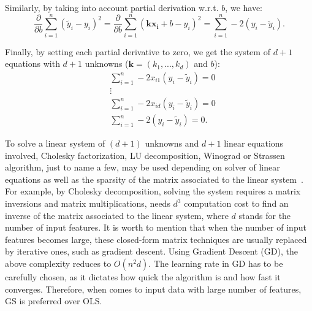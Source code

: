 \documentclass[a4paper,12pt]{elsarticle}
\begin{document}
	Similarly, by taking into account  partial derivation w.r.t. $b$, we have: 
	$$  \frac{\partial}{\partial b} \sum_{i=1}^{n} (\tilde{y}_i - y_i)^2  = \frac{\partial}{\partial b} \sum_{i=1}^{n} ( \mathbf{k}\mathbf{x_i}+b  - y_i)^2 = \sum_{i=1}^{n} -2  (y_i - \tilde{y}_i). $$
	
	Finally, by setting each partial derivative to zero, we get the system of $d+1$ equations with $d+1$ unknowns ($\mathbf{k}=(k_1, ..., k_d)$ and $b$): 
	\begin{align*}
		& \sum_{i=1}^{n} -2x_{i1} (y_i - \tilde{y}_i) = 0 \\
		& \vdots \\
		& \sum_{i=1}^{n} -2x_{id} (y_i - \tilde{y}_i) = 0 \\
		&\sum_{i=1}^{n} -2  (y_i - \tilde{y}_i) = 0.
	\end{align*}

To solve a linear system of $(d+1)$ unknowns and $d+1$ linear equations involved,  Cholesky  factorization, LU decomposition, Winograd or Strassen algorithm, just to name a few, may be used depending on solver of linear equations as well as the sparsity of the matrix associated to the linear system~\cite{krishnamoorthy2013matrix}. For example, by Cholesky decomposition, solving the system requires a matrix inversions and matrix multiplications, needs $d^3$ computation cost to find an inverse of the matrix associated to the linear system, where $d$ stands for the number of input features. It is worth to mention that when the number of input features becomes large, these closed-form matrix techniques are usually replaced by iterative ones, such as gradient descent. Using Gradient Descent (GD),  the above complexity reduces to $O(n^2d )$. The learning rate in GD has to be carefully chosen, as it dictates how quick the algorithm is and how fast it converges. Therefore, when comes to input data with large number of features, GS is preferred over OLS.
\end{document}
